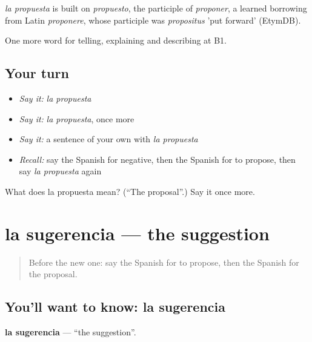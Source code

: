 \begin{cousinweb}
\emph{la propuesta} is built on \emph{propuesto}, the participle of \emph{proponer}, a learned borrowing from Latin \emph{proponere}, whose participle was \emph{propositus} 'put forward' (EtymDB).
\end{cousinweb}

\begin{grammarlens}[title={What you've built}]
One more word for telling, explaining and describing at B1.
\end{grammarlens}

\subsection*{Your turn}
\begin{itemize}
\raggedright
  \item \emph{Say it:} \emph{la propuesta}
  \item \emph{Say it:} \emph{la propuesta}, once more
  \item \emph{Say it:} a sentence of your own with \emph{la propuesta}
  \item \emph{Recall:} say the Spanish for negative, then the Spanish for to propose, then say \emph{la propuesta} again
\end{itemize}

\begin{tcolorbox}[breakable,colback=teal!4,colframe=teal!35!black,title={Before you move on}]
What does la propuesta mean? (\textquotedblleft{}The proposal\textquotedblright{}.) Say it once more.
\end{tcolorbox}
\section[la sugerencia]{la sugerencia — the suggestion}

\label{lesson:ES-C585-sugerencia}



\begin{quote}
Before the new one: say the Spanish for to propose, then the Spanish for the proposal.
\end{quote}

\subsection*{You'll want to know: la sugerencia}
\textbf{la sugerencia} — \textquotedblleft{}the suggestion\textquotedblright{}.

